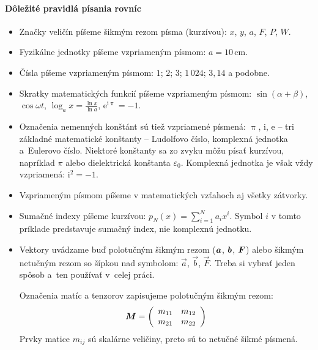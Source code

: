 \documentclass[../../../thesis.tex]{subfiles}
\begin{document}
\paragraph{Dôležité pravidlá písania rovníc}
\begin{itemize}

    \item Značky veličín píšeme šikmým rezom písma (kurzívou):
    $x$, $y$, $a$, $F$, $P$, $W$.

    \item Fyzikálne jednotky píšeme vzpriameným písmom:
    $a = 10\,\mathrm{cm}$.

    \item Čísla píšeme vzpriameným písmom:
    $1$; $2$; $3$; $1\,024$; $3{,}14$ a podobne.

    \item Skratky matematických funkcií píšeme vzpriameným
    písmom: $\sin(\alpha + \beta)$, $\cos\omega t$,
    $\log_a x = \frac{\ln x}{\ln a}$, $\mathrm{e^{i\uppi}}=-1$.

    \item Označenia nemenných konštánt sú tiež vzpriamené
    písmená: $\uppi$, $\mathrm i$, $\mathrm e$ --
    tri základné matematické konštanty --
    Ludolfovo číslo, komplexná jednotka a~Eulerovo číslo.
    Niektoré konštanty sa zo zvyku môžu písať kurzívou,
    napríklad $\pi$ alebo dielektrická konštanta $\varepsilon_0$.
    Komplexná jednotka je však vždy vzpriamená:
    $\mathrm i^2 = -1$.

    \item Vzpriameným písmom píšeme v matematických vzťahoch
    aj všetky zátvorky.

    \item Sumačné indexy píšeme kurzívou:
    $p_N(x) = \sum_{i=1}^N a_ix^i$.
    Symbol $i$ v tomto príklade predstavuje sumačný index,
    nie komplexnú jednotku.

    \item Vektory uvádzame buď polotučným šikmým rezom
    ($\vectorsym a$, $\vectorsym b$, $\vectorsym F$)
    alebo šikmým netučným rezom so šípkou nad symbolom:
    $\vec a$, $\vec b$, $\vec F$.
    Treba si vybrať jeden spôsob a~ten používať v~celej práci.

    Označenia matíc a tenzorov zapisujeme polotučným šikmým rezom:
    $$\matrixsym M = \left( \begin{array}{cc}
                            m_{11} & m_{12}\\
                            m_{21} & m_{22}
                        \end{array}\right)
    $$
    Prvky matice $m_{ij}$ sú skalárne veličiny, preto sú to
    netučné šikmé písmená.


\end{itemize}
\end{document}
